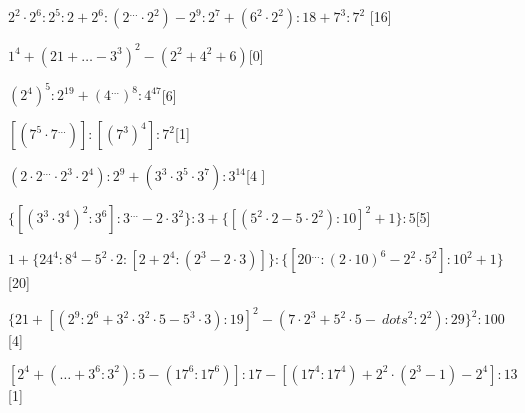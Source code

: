 \begin{esercizio} %
\(2^2\cdot2^6:2^5:2+2^6:(2^{\dots}\cdot2^2)-2^9:2^7+(6^2\cdot2^2):18+7^3:7^2\)
\hfill[16]
\end{esercizio}
\begin{esercizio} %
\(1^4+(21+{\dots}-3^3)^2-(2^2+4^2+6)\)\hfill[0]
\end{esercizio}
\begin{esercizio} %
\((2^4)^5:2^{19}+(4^{\dots})^8:4^{47}\)\hfill[6]
\end{esercizio}
\begin{esercizio} %
\([(7^5\cdot7^{\dots})]:[(7^3)^4]:7^2\)\hfill[1]
\end{esercizio}
\begin{esercizio} %
\((2\cdot2^{\dots}\cdot2^3\cdot2^4):2^9+(3^3\cdot3^5\cdot3^7):3^{14}\)\hfill[4
]
\end{esercizio}
\begin{esercizio} %
\(\{[(3^3\cdot3^4)^2:3^6]:3^{\dots}-2\cdot3^2\}:3+\{[(5^2\cdot2-5\cdot2^2):10]
^2+1\}:5\)\hfill[5]
\end{esercizio}
\begin{esercizio} %
\(1+\{24^4:8^4-5^2\cdot2:[2+2^4:(2^3-2\cdot3)]\}:\{[20^{\dots}:(2\cdot10)^6-2^
2\cdot5^2]:10^2+1\}\)\hfill[20]
\end{esercizio}
\begin{esercizio} %
\(\{21+[(2^9:2^6+3^2\cdot3^2\cdot5-5^3\cdot3):19]^2-(7\cdot2^3+5^2\cdot5-{\
dots}^2:2^2):29\}^2:100\)\hfill[4]
\end{esercizio}
\begin{esercizio} %
\([2^4+({\dots}+3^6:3^2):5-(17^6:17^6)]:17-[(17^4:17^4)+2^2\cdot(2^3-1)-2^4]:
13\)\hfill[1]
\end{esercizio}

\subsubsection*{}

